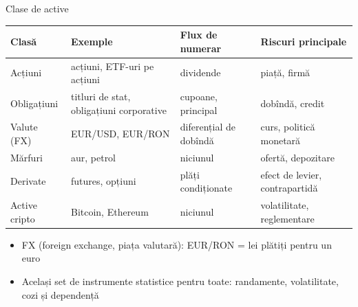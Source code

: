 \begin{frame}{Clase de active}
\itemsize{\footnotesize}
\begin{center}
\footnotesize
\begin{tabular}{>{\raggedright\arraybackslash}p{2.2cm}>{\raggedright\arraybackslash}p{4.0cm}>{\raggedright\arraybackslash}p{2.8cm}>{\raggedright\arraybackslash}p{3.2cm}}
\toprule
\textbf{Clasă} & \textbf{Exemple} & \textbf{Flux de numerar} & \textbf{Riscuri principale} \\
\midrule
Acțiuni & acțiuni, ETF-uri pe acțiuni & dividende & piață, firmă \\
Obligațiuni & titluri de stat, obligațiuni corporative & cupoane, principal & dobîndă, credit \\
Valute (FX) & EUR/USD, EUR/RON & diferențial de dobîndă & curs, politică monetară \\
Mărfuri & aur, petrol & niciunul & ofertă, depozitare \\
Derivate & futures, opțiuni & plăți condiționate & efect de levier, contrapartidă \\
Active cripto & Bitcoin, Ethereum & niciunul & volatilitate, reglementare \\
\bottomrule
\end{tabular}
\end{center}
\begin{itemize}
    \item FX (foreign exchange, piața valutară): EUR/RON = lei plătiți pentru un euro
    \item Același set de instrumente statistice pentru toate: randamente, volatilitate, cozi și dependență
\end{itemize}
\end{frame}

